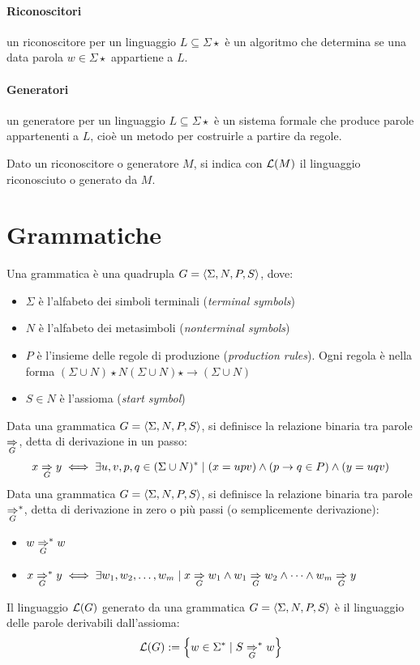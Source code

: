 \paragraph{Riconoscitori} un riconoscitore per un linguaggio $L\subseteq\Sigma\star$ è un algoritmo che determina se una data parola $w\in\Sigma\star$ appartiene a $L$.

\paragraph{Generatori} un generatore per un linguaggio $L\subseteq\Sigma\star$ è un sistema formale che produce parole appartenenti a $L$, cioè un metodo per costruirle a partire da regole.

Dato un riconoscitore o generatore $M$, si indica con $\mathcal L(M)$ il linguaggio riconosciuto o generato da $M$.



\section{Grammatiche}
\begin{defin}[grammatica]
	Una grammatica è una quadrupla $G=\langle \Sigma,N,P,S \rangle$, dove:
	\begin{itemize}
		\item $\Sigma$ è l'alfabeto dei simboli terminali (\emph{terminal symbols})
		\item $N$ è l'alfabeto dei metasimboli (\emph{nonterminal symbols})
		\item $P$ è l'insieme delle regole di produzione (\emph{production rules}). Ogni regola è nella forma $(\Sigma\cup N)\star N(\Sigma\cup N)\star\to(\Sigma\cup N)$
		\item $S\in N$ è l'assioma (\emph{start symbol})
	\end{itemize}
	Data una grammatica $G=\langle \Sigma,N,P,S \rangle$, si definisce la relazione binaria tra parole $\underset{G}{\Rightarrow}$, detta di derivazione in un passo:
	\begin{equation*}
		x\underset{G}{\Rightarrow} y \iff \exists u,v,p,q\in(\Sigma\cup N)^* \mid (x=upv)\land(p\to q\in P)\land(y=uqv)
	\end{equation*}
	Data una grammatica $G=\langle \Sigma,N,P,S \rangle$, si definisce la relazione binaria tra parole $\underset{G}{\Rightarrow}^*$, detta di derivazione in zero o più passi (o semplicemente derivazione):
	\begin{itemize}
		\item $w \underset{G}{\Rightarrow}^* w$
		\item $x \underset{G}{\Rightarrow}^* y \iff \exists w_1,w_2,\dots,w_m \mid x\underset{G}{\Rightarrow} w_1 \land w_1\underset{G}{\Rightarrow} w_2 \land\dots\land w_m\underset{G}{\Rightarrow}y$
	\end{itemize}
	Il linguaggio $\mathcal L(G)$ generato da una grammatica $G=\langle \Sigma,N,P,S \rangle$ è il linguaggio delle parole derivabili dall'assioma:
	\begin{equation*}
		\mathcal L(G) := \left\{ w\in\Sigma^*\mid S\underset{G}{\Rightarrow}^* w \right\}
	\end{equation*}
\end{defin}


